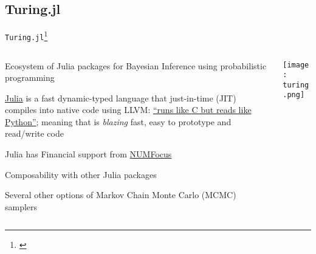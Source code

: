 \subsection{Turing.jl}
\begin{frame}{\texttt{Turing.jl}\footnote{\textcite{geTuringLanguageFlexible2018}}}
	\begin{columns}
		\begin{column}{0.8\textwidth}
			\begin{vfilleditems}
				\small
				\item Ecosystem of Julia packages for Bayesian
				Inference using probabilistic programming
				\item \href{https://www.julialang.org}{Julia} is a fast
				dynamic-typed language that just-in-time (JIT)
				compiles into native code using LLVM:
				\href{https://www.nature.com/articles/d41586-019-02310-3}{``runs like C but reads like Python''};
				meaning that is \textit{blazing} fast, easy to prototype and read/write code
				\item Julia has Financial support from
				\href{https://numfocus.org/}{NUMFocus}
				\item Composability with other Julia packages
				\item Several other options of Markov Chain Monte Carlo (MCMC) samplers
			\end{vfilleditems}
		\end{column}
		\begin{column}{0.2\textwidth}
			\centering
			\texttt{[image: turing.png]}
		\end{column}
	\end{columns}
\end{frame}

